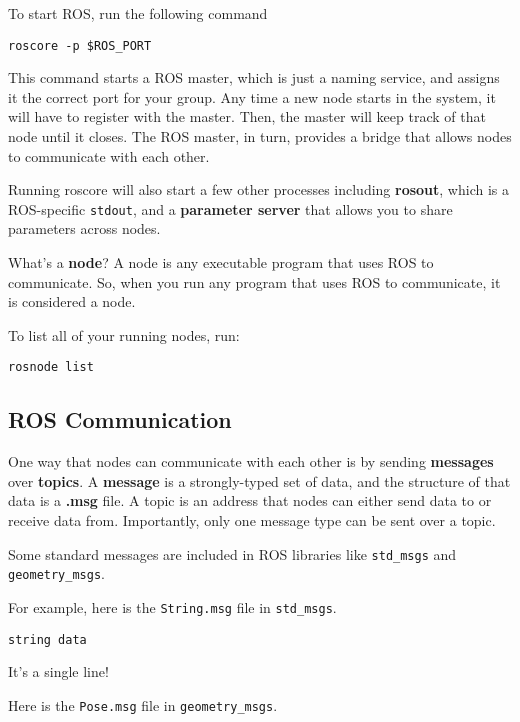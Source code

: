 To start ROS, run the following command 
\begin{lstlisting}
roscore -p $ROS_PORT
\end{lstlisting}
This command starts a ROS master, which is just a naming service, and assigns it the correct port for your group. Any time a new node starts in the system, it will have to register with the master. Then, the master will keep track of that node until it closes. The ROS master, in turn, provides a bridge that allows nodes to communicate with each other.

Running roscore will also start a few other processes including \textbf{rosout}, which is a ROS-specific \texttt{stdout}, and a \textbf{parameter server} that allows you to share parameters across nodes.   

What's a \textbf{node}? A node is any executable program that uses ROS to communicate. So, when you run any program that uses ROS to communicate, it is considered a node.

To list all of your running nodes, run:

\begin{lstlisting}
rosnode list
\end{lstlisting}

\subsection{ROS Communication}
One way that nodes can communicate with each other is by sending \textbf{messages} over \textbf{topics}. A \textbf{message} is a strongly-typed set of data, and the structure of that data is a \textbf{.msg} file. A topic is an address that nodes can either send data to or receive data from. Importantly, only one message type can be sent over a topic. 

Some standard messages are included in ROS libraries like \texttt{std\_msgs} and \texttt{geometry\_msgs}.

For example, here is the \texttt{String.msg} file in \texttt{std\_msgs}.

\begin{lstlisting}
string data
\end{lstlisting}


It's a single line!

Here is the \texttt{Pose.msg} file in \texttt{geometry\_msgs}.


